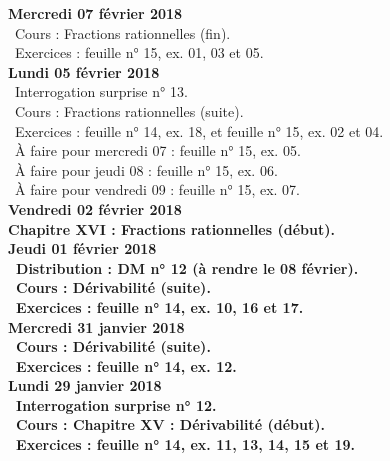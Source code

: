 \documentclass[12pt,a4paper]{article}
\begin{document}
\noindent\textbf{Mercredi 07 février 2018} \\
\bu\ Cours : Fractions rationnelles (fin).\\
\bu\ Exercices : feuille n° 15, ex. 01, 03 et 05.\vspace{.4cm}\\

\noindent\textbf{\bf Lundi 05 février 2018} \\
\bu\ Interrogation surprise n° 13.\\
\bu\ Cours : Fractions rationnelles (suite).\\
\bu\ Exercices : feuille n° 14, ex. 18, et feuille n° 15, ex. 02 et 04.\\
\bu\ À faire pour mercredi 07 : feuille n° 15, ex. 05.\\
\bu\ À faire pour jeudi 08 : feuille n° 15, ex. 06.\\
\bu\ À faire pour vendredi 09 : feuille n° 15, ex. 07.\vspace{.4cm}\\

\noindent\textbf{Vendredi 02 février 2018}\\
\bf Chapitre XVI \rm : Fractions rationnelles (début).\vspace{.4cm}\\

\noindent\textbf{Jeudi 01 février 2018}\\
\bu\ Distribution : DM n° 12 (à rendre le 08 février).\\
\bu\ Cours : Dérivabilité (suite).\\
\bu\ Exercices : feuille n° 14, ex. 10, 16 et 17.\vspace{.4cm}\\

\noindent\textbf{Mercredi 31 janvier 2018} \\
\bu\ Cours : Dérivabilité (suite).\\
\bu\ Exercices : feuille n° 14, ex. 12.\vspace{.4cm}\\

\noindent\textbf{Lundi 29 janvier 2018} \\
\bu\ Interrogation surprise n° 12.\\
\bu\ Cours : \bf Chapitre XV \rm : Dérivabilité (début).\\
\bu\ Exercices : feuille n° 14, ex. 11, 13, 14, 15 et 19.\vspace{.4cm}\\
\end{document}
